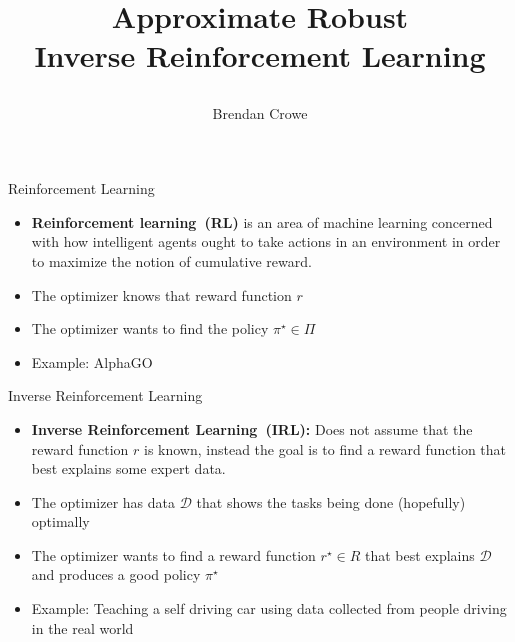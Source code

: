 \documentclass[9pt]{beamer}
\title{\parbox{\linewidth}{\centering Approximate Robust \\Inverse Reinforcement Learning}}
\author{Brendan Crowe}
\newcommand{\data}{\mathcal{D}}
\begin{document}
\titlepage



\begin{frame}{Reinforcement Learning}
\begin{itemize}
    \item<1-> \textbf{Reinforcement learning~(RL)} is an area of machine learning concerned with how intelligent agents ought to take actions in an environment in order to maximize the notion of cumulative reward. \cite{enwiki:1019990151}
    \vfill
    \item <2-> The optimizer knows that reward function $r$
    \vfill
    \item <3-> The optimizer wants to find the policy $\pi^{\star} \in \Pi$
    \vfill
    \item <4-> Example: AlphaGO
    \vfill
\end{itemize}
\end{frame}
\begin{frame}{Inverse Reinforcement Learning}
\begin{itemize}
    \item<1-> \textbf{Inverse Reinforcement Learning~(IRL):} Does not assume that the reward function $r$ is known, instead the goal is to find a reward function that best explains some expert data.
    \item<2-> The optimizer has data $\data$ that shows the tasks being done (hopefully) optimally 
    \item <3->The optimizer wants to find a reward function $r^{\star} \in R$ that best explains $\data$ and produces a good policy $\pi^{\star}$
    \item <4->Example: Teaching a self driving car using data collected from people driving in the real world
\end{itemize}
\end{frame}
\end{document}
